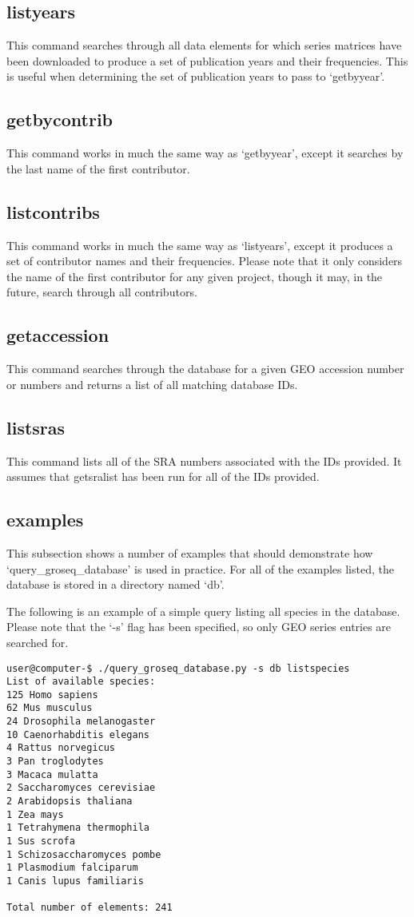 \documentclass[12pt,letterpaper]{article}
\begin{document}
\subsection{listyears}
This command searches through all data elements for which series matrices have been downloaded to produce a set of publication years and their frequencies. 
This is useful when determining the set of publication years to pass to `getbyyear'.

\subsection{getbycontrib}
This command works in much the same way as `getbyyear', except it searches by the last name of the first contributor.

\subsection{listcontribs}
This command works in much the same way as `listyears', except it produces a set of contributor names and their frequencies. Please note that it only considers
the name of the first contributor for any given project, though it may, in the future, search through all contributors.

\subsection{getaccession}
This command searches through the database for a given GEO accession number or numbers and
returns a list of all matching database IDs. 

\subsection{listsras}
This command lists all of the SRA numbers associated with the IDs provided. It assumes that
getsralist has been run for all of the IDs provided.

\subsection{examples}
This subsection shows a number of examples that should demonstrate how `query\_groseq\_database' is used in practice.
For all of the examples listed, the database is stored in a directory named `db'.

The following is an example of a simple query listing all species in the database. Please note that the `-s' flag has been specified, so
only GEO series entries are searched for.
\begin{verbatim}
user@computer-$ ./query_groseq_database.py -s db listspecies
List of available species:
125 Homo sapiens
62 Mus musculus
24 Drosophila melanogaster
10 Caenorhabditis elegans
4 Rattus norvegicus
3 Pan troglodytes
3 Macaca mulatta
2 Saccharomyces cerevisiae
2 Arabidopsis thaliana
1 Zea mays
1 Tetrahymena thermophila
1 Sus scrofa
1 Schizosaccharomyces pombe
1 Plasmodium falciparum
1 Canis lupus familiaris

Total number of elements: 241
\end{verbatim}
\end{document}
